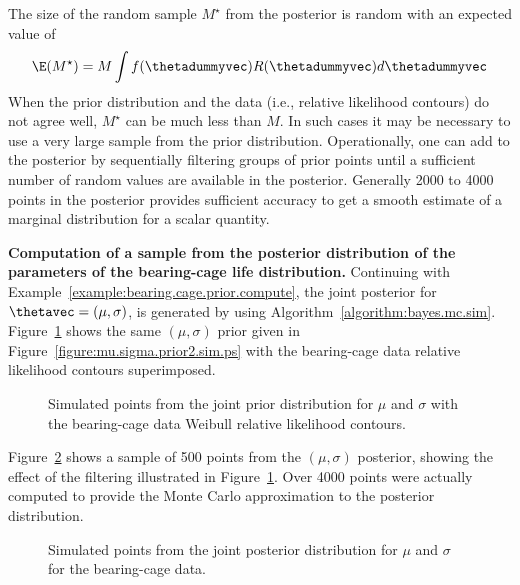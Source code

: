 The size of the random sample $M^{\star}$ from the posterior is random
with an expected value of
\begin{displaymath}
\E(M^{\star})=M \int f(\thetadummyvec)R(\thetadummyvec) d \thetadummyvec
\end{displaymath}
When the prior distribution and the data (i.e., relative likelihood
contours) do not agree well, $M^{\star}$ can be much less than
$M$. In such cases it may be necessary to use a very large sample
from the prior distribution.  Operationally, one can add to the
posterior by sequentially filtering groups of prior points until a
sufficient number of random values are available in the
posterior. Generally 2000 to 4000 points in the posterior provides
sufficient accuracy to get a smooth estimate of a marginal
distribution for a scalar quantity.

\begin{example}
\label{example:bearing.cage.post.compute}
{\bf Computation of a sample from the posterior distribution
of the parameters of the bearing-cage life distribution.} Continuing
with Example~\ref{example:bearing.cage.prior.compute}, the joint
posterior for $\thetavec=(\mu, \sigma)$, is generated 
by using Algorithm~\ref{algorithm:bayes.mc.sim}.
Figure~\ref{figure:bcage.weib.cont.ps} shows the same $(\mu, \sigma)$
prior given in Figure~\ref{figure:mu.sigma.prior2.sim.ps} with the
bearing-cage data relative likelihood contours superimposed.
\begin{figure}
\caption{Simulated points from the joint 
prior distribution for $\mu$ and $\sigma$ with the bearing-cage data
Weibull relative likelihood contours.}
\label{figure:bcage.weib.cont.ps}
\end{figure}
Figure~\ref{figure:joint.postx.bcage.ps} shows a sample of 500 points
from the $(\mu, \sigma)$ posterior, showing the effect of the
filtering illustrated in Figure~\ref{figure:bcage.weib.cont.ps}.
Over 4000 points were actually computed to provide 
the Monte Carlo approximation to the posterior distribution.
\begin{figure}
\caption{Simulated points from the joint posterior distribution 
	for $\mu$ and $\sigma$ for the bearing-cage data.}
\label{figure:joint.postx.bcage.ps}
\end{figure}
\end{example}

